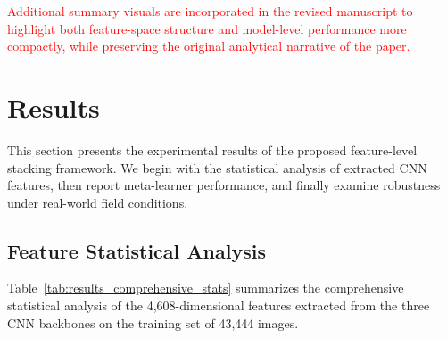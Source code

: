 \documentclass[pdflatex,sn-basic]{sn-jnl}
\begin{document}
\textcolor{red}{Additional summary visuals are incorporated in the revised manuscript to highlight both feature-space structure and model-level performance more compactly, while preserving the original analytical narrative of the paper.}

\section{Results}
\label{sec:results}

This section presents the experimental results of the proposed feature-level stacking framework. We begin with the statistical analysis of extracted CNN features, then report meta-learner performance, and finally examine robustness under real-world field conditions.

\subsection{Feature Statistical Analysis}
\label{subsec:results_feature_stats}

Table~\ref{tab:results_comprehensive_stats} summarizes the comprehensive statistical analysis of the 4,608-dimensional features extracted from the three CNN backbones on the training set of 43,444 images.
\end{document}
